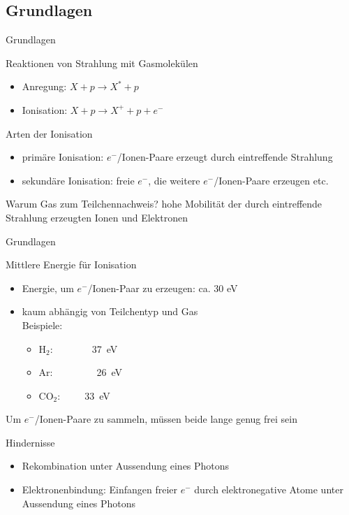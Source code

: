\subsection{Grundlagen}

\begin{frame}{Grundlagen}
	\begin{block}{Reaktionen von Strahlung mit Gasmolekülen}
		\begin{itemize}
		  \item Anregung:	$X+p\rightarrow X^*+p$\\
		  \item Ionisation:	$X+p\rightarrow X^++p+e^-$\\
		\end{itemize}		
	\end{block}

	\begin{block}{Arten der Ionisation}
		\begin{itemize}
		  \item primäre Ionisation: $e^-$/Ionen-Paare erzeugt durch eintreffende Strahlung
		  \item sekundäre Ionisation: freie $e^-$, die weitere $e^-$/Ionen-Paare erzeugen
		  etc.
		\end{itemize}
	\end{block}	
	
	\begin{block}{Warum Gas zum Teilchennachweis?}
		 hohe Mobilität der durch eintreffende Strahlung erzeugten Ionen und Elektronen
	\end{block}
\end{frame}


\begin{frame}{Grundlagen}
	\begin{block}{Mittlere Energie für Ionisation}
		\begin{itemize}
		  \item Energie, um $e^-$/Ionen-Paar zu erzeugen: ca. 30 eV
		  \item kaum abhängig von Teilchentyp und Gas\\
		   \vspace*{0.2cm}
				Beispiele:
		  				\begin{itemize}
		 					 \item H$_2$:~~~~~~~~37~eV
		 					 \item Ar:~~~~~~~~~26~eV
		 					 \item CO$_2$:~~~~~33~eV
						\end{itemize}
		\end{itemize}
	\end{block}
	\vspace*{0.5cm}
	Um $e^-$/Ionen-Paare zu sammeln, müssen beide lange genug frei sein
	\begin{block}{Hindernisse}
			\begin{itemize}
		  \item Rekombination unter Aussendung eines Photons
		  \item Elektronenbindung: Einfangen freier $e^-$ durch elektronegative Atome unter Aussendung
		  eines Photons
		\end{itemize}
	\end{block}
\end{frame}

